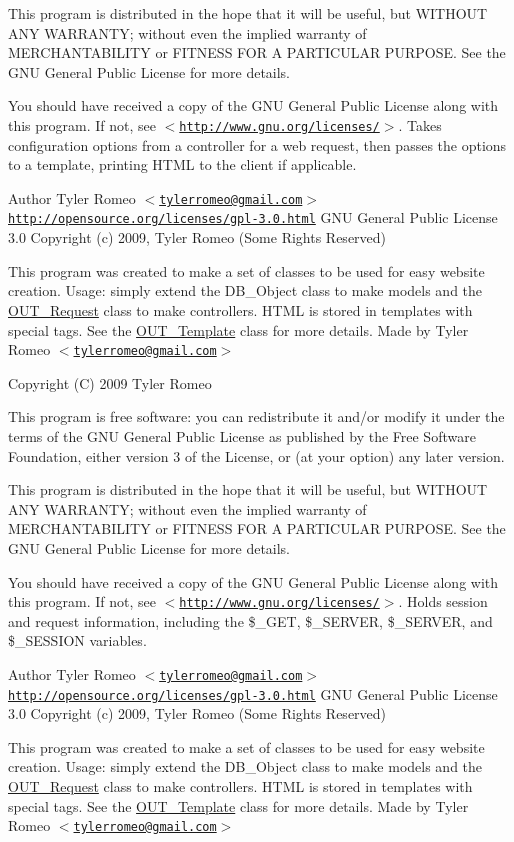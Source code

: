 This program is distributed in the hope that it will be useful, but WITHOUT ANY WARRANTY; without even the implied warranty of MERCHANTABILITY or FITNESS FOR A PARTICULAR PURPOSE. See the GNU General Public License for more details.

You should have received a copy of the GNU General Public License along with this program. If not, see $<$\href{http://www.gnu.org/licenses/}{\tt http://www.gnu.org/licenses/}$>$. Takes configuration options from a controller for a web request, then passes the options to a template, printing HTML to the client if applicable.

\begin{DoxyAuthor}{Author}
Tyler Romeo $<$\href{mailto:tylerromeo@gmail.com}{\tt tylerromeo@gmail.com}$>$  \href{http://opensource.org/licenses/gpl-3.0.html}{\tt http://opensource.org/licenses/gpl-\/3.0.html} GNU General Public License 3.0  Copyright (c) 2009, Tyler Romeo (Some Rights Reserved)
\end{DoxyAuthor}
This program was created to make a set of classes to be used for easy website creation. Usage: simply extend the DB\_\-Object class to make models and the \hyperlink{classOUT__Request}{OUT\_\-Request} class to make controllers. HTML is stored in templates with special tags. See the \hyperlink{classOUT__Template}{OUT\_\-Template} class for more details. Made by Tyler Romeo $<$\href{mailto:tylerromeo@gmail.com}{\tt tylerromeo@gmail.com}$>$

Copyright (C) 2009 Tyler Romeo

This program is free software: you can redistribute it and/or modify it under the terms of the GNU General Public License as published by the Free Software Foundation, either version 3 of the License, or (at your option) any later version.

This program is distributed in the hope that it will be useful, but WITHOUT ANY WARRANTY; without even the implied warranty of MERCHANTABILITY or FITNESS FOR A PARTICULAR PURPOSE. See the GNU General Public License for more details.

You should have received a copy of the GNU General Public License along with this program. If not, see $<$\href{http://www.gnu.org/licenses/}{\tt http://www.gnu.org/licenses/}$>$. Holds session and request information, including the \$\_\-GET, \$\_\-SERVER, \$\_\-SERVER, and \$\_\-SESSION variables.

\begin{DoxyAuthor}{Author}
Tyler Romeo $<$\href{mailto:tylerromeo@gmail.com}{\tt tylerromeo@gmail.com}$>$  \href{http://opensource.org/licenses/gpl-3.0.html}{\tt http://opensource.org/licenses/gpl-\/3.0.html} GNU General Public License 3.0  Copyright (c) 2009, Tyler Romeo (Some Rights Reserved)
\end{DoxyAuthor}
This program was created to make a set of classes to be used for easy website creation. Usage: simply extend the DB\_\-Object class to make models and the \hyperlink{classOUT__Request}{OUT\_\-Request} class to make controllers. HTML is stored in templates with special tags. See the \hyperlink{classOUT__Template}{OUT\_\-Template} class for more details. Made by Tyler Romeo $<$\href{mailto:tylerromeo@gmail.com}{\tt tylerromeo@gmail.com}$>$


